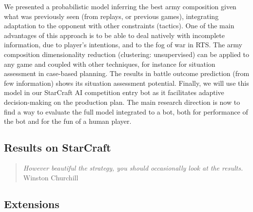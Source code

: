 We presented a probabilistic model inferring the best army composition given what was previously seen (from replays, or previous games), integrating adaptation to the opponent with other constraints (tactics). One of the main advantages of this approach is to be able to deal natively with incomplete information, due to player's intentions, and to the fog of war in RTS. The army composition dimensionality reduction (clustering: unsupervised) can be applied to any game and coupled with other techniques, for instance for situation assessment in case-based planning. The results in battle outcome prediction (from few information) shows its situation assessment potential. Finally, we will use this model in our StarCraft AI competition entry bot as it facilitates adaptive decision-making on the production plan. The main research direction is now to find a way to evaluate the full model integrated to a bot, both for performance of the bot and for the fun of a human player.


\subsection{Results on StarCraft}

\begin{quotation}\textit{
However beautiful the strategy, you should occasionally look at the results.
} Winston Churchill\end{quotation}

\subsection{Extensions}

